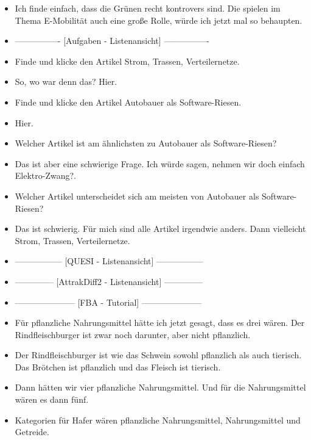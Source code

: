 {\begin{itemize}[]
            \item {} Ich finde einfach, dass die Grünen recht kontrovers sind.
                  Die spielen im Thema E-Mobilität auch eine große Rolle, würde ich jetzt mal so behaupten.
            \item {----------------} [Aufgaben - Listenansicht] {----------------}
            \item {} Finde und klicke den Artikel \flqq Strom, Trassen, Verteilernetze\frqq{}.
            \item {} So, wo war denn das? Hier.
            \item {} Finde und klicke den Artikel \flqq Autobauer als Software-Riesen\frqq{}.
            \item {} Hier.
            \item {} Welcher Artikel ist am ähnlichsten zu \flqq Autobauer als Software-Riesen\frqq{}?
            \item {} Das ist aber eine schwierige Frage. Ich würde sagen, nehmen wir doch einfach \flqq Elektro-Zwang?\frqq{}.
            \item {} Welcher Artikel unterscheidet sich am meisten von \flqq Autobauer als Software-Riesen\frqq{}?
            \item {} Das ist schwierig. Für mich sind alle Artikel irgendwie anders. Dann vielleicht \flqq Strom, Trassen, Verteilernetze\frqq{}.
            \item {-----------------} [QUESI - Listenansicht] {-----------------}
            \item {--------------} [AttrakDiff2 - Listenansicht] {--------------}
            \item {---------------------} [FBA - Tutorial] {---------------------}
            \item {} Für pflanzliche Nahrungsmittel hätte ich jetzt gesagt, dass es drei wären.
                  Der Rindfleischburger ist zwar noch darunter, aber nicht pflanzlich.
            \item {} Der Rindfleischburger ist wie das Schwein sowohl pflanzlich als auch tierisch. Das Brötchen ist pflanzlich und das Fleisch ist tierisch.
            \item {} Dann hätten wir vier pflanzliche Nahrungsmittel. Und für die Nahrungsmittel wären es dann fünf.
            \item {} Kategorien für Hafer wären pflanzliche Nahrungsmittel, Nahrungsmittel und Getreide.

\end{itemize}}
